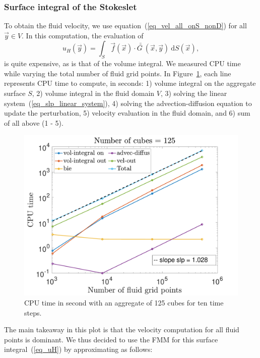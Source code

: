\subsubsection{Surface integral of the Stokeslet}
To obtain the fluid velocity, we use equation~(\ref{eq_vel_all_onS_nonD}) for all $\vec{y} \in V$. In this computation, the evaluation of
\begin{equation}
	u_H(\vec{y})  
	= \int_S \vec{f}(\vec{x}) \cdot \bar{\bar{G \ }}( \vec{x}, \vec{y}) \ \text{d} S(\vec{x}),
	\label{eq_uH}
\end{equation}
is quite expensive, as is that of the volume integral. 
We measured CPU time while varying the total number of fluid grid points. 
In Figure~\ref{fig_time_fmm_sum}, each line represents CPU time to compute, in seconds: 1) volume integral on the aggregate surface $S$, 2) volume integral in the fluid domain $V$, 3) solving the linear system~(\ref{eq_slp_linear_system}), 4) solving the advection-diffusion equation to update the perturbation, 5) velocity evaluation in the fluid domain, and 6) sum of all above (1 - 5).
\begin{figure}[ht]
	\begin{center}
		\includegraphics[scale=0.35]{./figures/fig_time_varNx5}
	\caption{CPU time in second with an aggregate of 125 cubes for ten time steps.}
	\label{fig_time_fmm_sum}
\end{center}
\end{figure}
The main takeaway in this plot is that the velocity computation for all fluid points is dominant. 
We thus decided to use the FMM for this surface integral~(\ref{eq_uH}) by approximating as follows:
